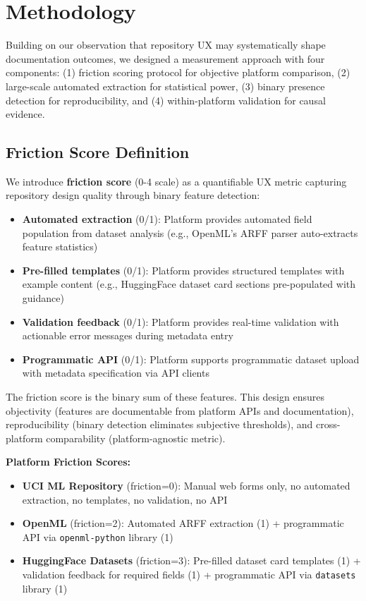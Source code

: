 \section{Methodology}
\label{sec:methodology}

Building on our observation that repository UX may systematically shape documentation outcomes, we designed a measurement approach with four components: (1) friction scoring protocol for objective platform comparison, (2) large-scale automated extraction for statistical power, (3) binary presence detection for reproducibility, and (4) within-platform validation for causal evidence.

\subsection{Friction Score Definition}

We introduce \textbf{friction score} (0-4 scale) as a quantifiable UX metric capturing repository design quality through binary feature detection:

\begin{itemize}
\item \textbf{Automated extraction} (0/1): Platform provides automated field population from dataset analysis (e.g., OpenML's ARFF parser auto-extracts feature statistics)
\item \textbf{Pre-filled templates} (0/1): Platform provides structured templates with example content (e.g., HuggingFace dataset card sections pre-populated with guidance)
\item \textbf{Validation feedback} (0/1): Platform provides real-time validation with actionable error messages during metadata entry
\item \textbf{Programmatic API} (0/1): Platform supports programmatic dataset upload with metadata specification via API clients
\end{itemize}

The friction score is the binary sum of these features. This design ensures objectivity (features are documentable from platform APIs and documentation), reproducibility (binary detection eliminates subjective thresholds), and cross-platform comparability (platform-agnostic metric).

\textbf{Platform Friction Scores:}
\begin{itemize}
\item \textbf{UCI ML Repository} (friction=0): Manual web forms only, no automated extraction, no templates, no validation, no API
\item \textbf{OpenML} (friction=2): Automated ARFF extraction (1) + programmatic API via \texttt{openml-python} library (1)
\item \textbf{HuggingFace Datasets} (friction=3): Pre-filled dataset card templates (1) + validation feedback for required fields (1) + programmatic API via \texttt{datasets} library (1)
\end{itemize}

